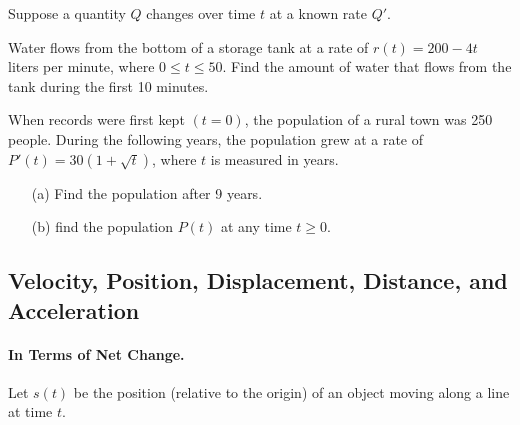 \documentclass[12pt]{article}
\begin{document}
Suppose a quantity $Q$ changes over time $t$ at a known rate $Q'$.\\


\vspace{5mm}


\newpage

\Example Water flows from the bottom of a storage tank at a rate of $r(t)=200-4t$ liters per minute, where $0\leq t\leq 50$. Find the amount of water that flows from the tank during the first 10 minutes.

\vspace{60mm}

\Example When records were first kept $(t=0)$, the population of a rural town was 250 people. During the following years, the population grew at a rate of $P'(t)=30\left(1+\sqrt{t}\right)$, where $t$ is measured in years.

\begin{enumerate}
\item[(a)] Find the population after 9 years.

\vspace{60mm}

\item[(b)] find the population $P(t)$ at any time $t\geq 0$.
\end{enumerate}

\newpage

\subsection*{Velocity, Position, Displacement, Distance, and Acceleration}

\paragraph{In Terms of Net Change.} Let $s(t)$ be the position (relative to the origin) of an object moving along a line at time $t$.\\
\end{document}
